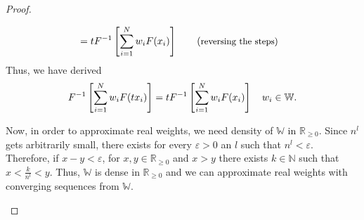\begin{proof}
\begin{proofpart}
\begin{proofpp}
\begin{align*}
				                                                    & = t F^{-1} \left[ \sum_{i=1}^{N} w_i F(\ta_i) \right] \tag{\small{reversing the steps}}                          %
			\end{align*}
			Thus, we have derived
			\begin{equation} \label{proof-homogen-rats}
				F^{-1} \left[ \sum_{i=1}^{N} w_i F(t x_i) \right] = t F^{-1} \left[ \sum_{i=1}^{N} w_i F(x_i) \right] \quad w_i \in \mathbb{W}.
			\end{equation}

			Now, in order to approximate real weights, we need density of $\mathbb{W}$ in $\mathbb{R}_{\geq 0}$. Since $n^l$ gets arbitrarily small, there exists for every $\varepsilon >0$ an $l$ such that $n^l < \varepsilon$. Therefore, if $x - y < \varepsilon$, for $x, y \in \mathbb{R}_{\geq 0}$ and $x > y$ there exists $k \in \mathbb{N}$ such that $x < \frac{k}{n^l} < y$. Thus, $\mathbb{W}$ is dense in $\mathbb{R}_{\geq 0}$ and we can approximate real weights with converging sequences from $\mathbb{W}$.


\end{proofpp}
\end{proofpart}
\end{proof}

